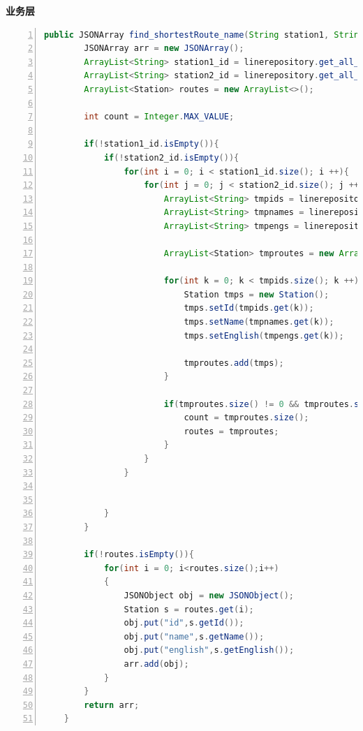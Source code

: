 \documentclass[11pt,a4paper]{article}
\begin{document}
\textbf{业务层} \\
\begin{lstlisting}[numbers = left, 
showstringspaces=false,
showspaces = false,
breaklines = true, 
language=Java]
    public JSONArray find_shortestRoute_name(String station1, String station2){
        JSONArray arr = new JSONArray();
        ArrayList<String> station1_id = linerepository.get_all_station_ids_by_name(station1);
        ArrayList<String> station2_id = linerepository.get_all_station_ids_by_name(station2);
        ArrayList<Station> routes = new ArrayList<>();

        int count = Integer.MAX_VALUE;

        if(!station1_id.isEmpty()){
            if(!station2_id.isEmpty()){
                for(int i = 0; i < station1_id.size(); i ++){
                    for(int j = 0; j < station2_id.size(); j ++){
                        ArrayList<String> tmpids = linerepository.shortestpath_by_id_id(station1_id.get(i), station2_id.get(j));
                        ArrayList<String> tmpnames = linerepository.shortestpath_by_id_name(station1_id.get(i), station2_id.get(j));
                        ArrayList<String> tmpengs = linerepository.shortestpath_by_id_eng(station1_id.get(i), station2_id.get(j));

                        ArrayList<Station> tmproutes = new ArrayList<>();

                        for(int k = 0; k < tmpids.size(); k ++){
                            Station tmps = new Station();
                            tmps.setId(tmpids.get(k));
                            tmps.setName(tmpnames.get(k));
                            tmps.setEnglish(tmpengs.get(k));

                            tmproutes.add(tmps);
                        }

                        if(tmproutes.size() != 0 && tmproutes.size() < count){
                            count = tmproutes.size();
                            routes = tmproutes;
                        }
                    }
                }


            }
        }

        if(!routes.isEmpty()){
            for(int i = 0; i<routes.size();i++)
            {
                JSONObject obj = new JSONObject();
                Station s = routes.get(i);
                obj.put("id",s.getId());
                obj.put("name",s.getName());
                obj.put("english",s.getEnglish());
                arr.add(obj);
            }
        }
        return arr;
    }
\end{lstlisting} 
\end{document}

